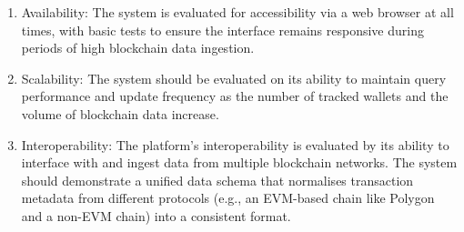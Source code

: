 \begin{enumerate}
\item Availability: The system is evaluated for accessibility via a web browser at all times, with basic tests to ensure the interface remains responsive during periods of high blockchain data ingestion.
\item Scalability: The system should be evaluated on its ability to maintain query performance and update frequency as the number of tracked wallets and the volume of blockchain data increase.
\item Interoperability: The platform’s interoperability is evaluated by its ability to interface with and ingest data from multiple blockchain networks. The system should demonstrate a unified data schema that normalises transaction metadata from different protocols (e.g., an EVM-based chain like Polygon and a non-EVM chain) into a consistent format.
\end{enumerate}


